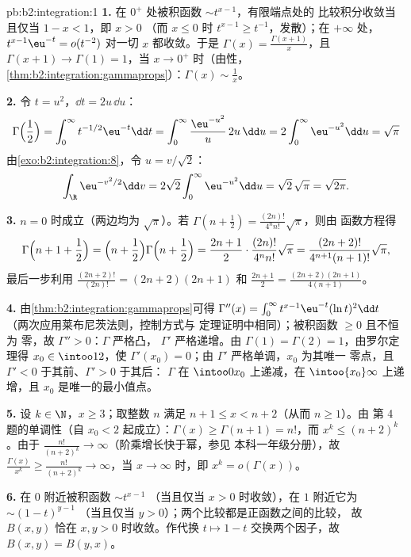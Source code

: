 \begin{solution}{pb:b2:integration:1}
\textbf{1.} 在 $0^+$ 处被积函数 $\sim t^{x-1}$，有限端点处的
比较积分收敛当且仅当 $1 - x < 1$，即 $x > 0$
（而 $x \leq 0$ 时 $t^{x-1} \geq t^{-1}$，发散）；在
$+\infty$ 处，$t^{x-1}\eu^{-t} = o(t^{-2})$ 对一切
$x$ 都收敛。于是 $\Gamma(x) = \frac{\Gamma(x+1)}{x}$，且 $\Gamma(x+1)
\to \Gamma(1) = 1$，当 $x \to 0^+$ 时（由性，
\cref{thm:b2:integration:gammaprops}）：$\Gamma(x) \sim
\frac1x$。

\textbf{2.} 令 $t = u^2$，$\dd t = 2u\,\dd u$：
\[
\Gamma\Bigl(\frac12\Bigr) = \int_0^\infty
t^{-1/2}\eu^{-t}\dd t
= \int_0^\infty \frac{\eu^{-u^2}}{u}\,2u\,\dd u
= 2\int_0^\infty \eu^{-u^2}\dd u = \sqrt\pi
\]
由\cref{exo:b2:integration:8}，令 $u = v/\sqrt2$：
\[
\int_\R \eu^{-v^2/2}\dd v
= 2\sqrt2\int_0^\infty \eu^{-u^2}\dd u
= \sqrt2\,\sqrt\pi = \sqrt{2\pi} .
\]

\textbf{3.} $n = 0$ 时成立（两边均为 $\sqrt\pi$）。若
$\Gamma(n + \frac12) = \frac{(2n)!}{4^n n!}\sqrt\pi$，则由
函数方程得
\[
\Gamma\Bigl(n + 1 + \frac12\Bigr)
= \Bigl(n + \frac12\Bigr)\Gamma\Bigl(n + \frac12\Bigr)
= \frac{2n+1}{2}\cdot\frac{(2n)!}{4^n n!}\sqrt\pi
= \frac{(2n+2)!}{4^{n+1}(n+1)!}\sqrt\pi ,
\]
最后一步利用 $\frac{(2n+2)!}{(2n)!} = (2n+2)(2n+1)$
和 $\frac{2n+1}{2} = \frac{(2n+2)(2n+1)}{4(n+1)}$。

\textbf{4.} 由\cref{thm:b2:integration:gammaprops}可得
$\Gamma''(x) = \int_0^\infty t^{x-1}\eu^{-t}(\ln t)^2\dd t$
（两次应用莱布尼茨法则，控制方式与
定理证明中相同）；被积函数 $\geq 0$ 且不恒为
零，故 $\Gamma'' > 0$：$\Gamma$ 严格凸，
$\Gamma'$ 严格递增。由 $\Gamma(1) = \Gamma(2)
= 1$，由罗尔定理得 $x_0 \in \intoo12$，使 $\Gamma'(x_0) =
0$；由 $\Gamma'$ 严格单调，$x_0$ 为其唯一
零点，且 $\Gamma' < 0$ 于其前、$\Gamma' > 0$ 于其后：
$\Gamma$ 在 $\intoo0{x_0}$ 上递减，在
$\intoo{x_0}\infty$ 上递增，且 $x_0$ 是唯一的最小值点。

\textbf{5.} 设 $k \in \N$，$x \geq 3$；取整数
$n$ 满足 $n + 1 \leq x < n + 2$（从而 $n \geq 1$）。由
第 4 题的单调性（自 $x_0 < 2$ 起成立）：$\Gamma(x)
\geq \Gamma(n + 1) = n!$，而 $x^k \leq (n+2)^k$。由于
$\frac{n!}{(n+2)^k} \to \infty$（阶乘增长快于幂，参见
本科一年级分册），故 $\frac{\Gamma(x)}{x^k} \geq \frac{n!}{(n+2)^k} \to
\infty$，当 $x \to \infty$ 时，即 $x^k = o(\Gamma(x))$。

\textbf{6.} 在 $0$ 附近被积函数 $\sim t^{x-1}$
（当且仅当 $x > 0$ 时收敛），在 $1$ 附近它为 $\sim (1-t)^{y-1}$
（当且仅当 $y > 0$）；两个比较都是正函数之间的比较，
故 $B(x,y)$ 恰在 $x, y > 0$ 时收敛。作代换
$t \mapsto 1 - t$ 交换两个因子，故 $B(x,y) = B(y,x)$。


\end{solution}
